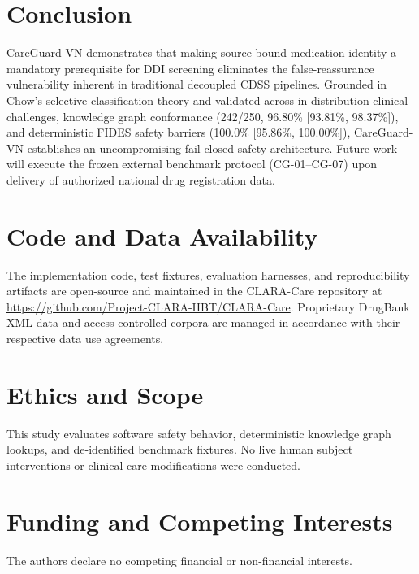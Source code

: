 \documentclass[11pt]{article}
\newcommand{\repo}{\url{https://github.com/Project-CLARA-HBT/CLARA-Care}}
\begin{document}
\section{Conclusion}
CareGuard-VN demonstrates that making source-bound medication identity a mandatory prerequisite for DDI screening eliminates the false-reassurance vulnerability inherent in traditional decoupled CDSS pipelines. Grounded in Chow's selective classification theory and validated across in-distribution clinical challenges, knowledge graph conformance (242/250, 96.80\% [93.81\%, 98.37\%]), and deterministic FIDES safety barriers (100.0\% [95.86\%, 100.00\%]), CareGuard-VN establishes an uncompromising fail-closed safety architecture. Future work will execute the frozen external benchmark protocol (CG-01--CG-07) upon delivery of authorized national drug registration data.

\section*{Code and Data Availability}
The implementation code, test fixtures, evaluation harnesses, and reproducibility artifacts are open-source and maintained in the CLARA-Care repository at \repo. Proprietary DrugBank XML data and access-controlled corpora are managed in accordance with their respective data use agreements.

\section*{Ethics and Scope}
This study evaluates software safety behavior, deterministic knowledge graph lookups, and de-identified benchmark fixtures. No live human subject interventions or clinical care modifications were conducted.

\section*{Funding and Competing Interests}
The authors declare no competing financial or non-financial interests.
\end{document}

